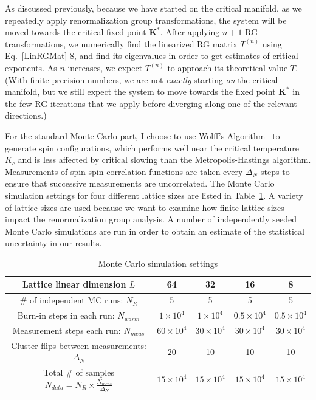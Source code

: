 \documentclass[12pt]{article}
\renewcommand{\vec}[1]{\mathbf{#1}}
\begin{document}
As discussed previously, because we have started on the critical manifold, as we repeatedly apply renormalization group transformations, the system will be moved towards the critical fixed point $\vec{K^*}$. After applying $n+1$ RG transformations, we numerically find the linearized RG matrix $T^{(n)}$ using Eq.~\ref{LinRGMat}-8, and find its eigenvalues in order to get estimates of critical exponents. As $n$ increases, we expect $T^{(n)}$ to approach its theoretical value $T$. (With finite precision numbers, we are not \textit{exactly} starting \textit{on} the critical manifold, but we still expect the system to move towards the fixed point $\vec{K^*}$ in the few RG iterations that we apply before diverging along one of the relevant directions.) 

For the standard Monte Carlo part, I choose to use Wolff's Algorithm~\cite{Wolff1989} to generate spin configurations, which performs well near the critical temperature $K_c$ and is less affected by critical slowing than the Metropolis-Hastings algorithm. Measurements of spin-spin correlation functions are taken every $\Delta_N$ steps to ensure that successive measurements are uncorrelated. The Monte Carlo simulation settings for four different lattice sizes are listed in Table~\ref{MCSettings}. A variety of lattice sizes are used because we want to examine how finite lattice sizes impact the renormalization group analysis. A number of independently seeded Monte Carlo simulations are run in order to obtain an estimate of the statistical uncertainty in our results.

\begin{table}[H]
\centering
\begin{tabular}{|c|c|c|c|c|} 
 \hline
 Lattice linear dimension $L$ & 64 & 32 & 16 & 8 \\ 
 \hline
 \# of independent MC runs: $N_R$ & 5&5&5&5\\
 Burn-in steps in each run:  $N_{warm}$ & $1\times 10^4$& $1\times 10^4$& $0.5\times 10^4$& $0.5\times 10^4$ \\ 
 Measurement steps each run: $N_{meas}$& $60\times 10^4$& $30\times 10^4$& $30\times 10^4$& $30\times 10^4$\\
 Cluster flips between measurements: $\Delta_N$ & 20 & 10 & 10 & 10 \\
 \hline
 Total \# of samples $N_{data} = N_R\times \frac{N_{meas}}{\Delta_{N}}$ & $15\times 10^4$& $15 \times 10^4$& $15\times 10^4$& $15\times 10^4$ \\
 \hline
 \end{tabular}
 \caption{\label{MCSettings}Monte Carlo simulation settings}
\end{table}
\end{document}
